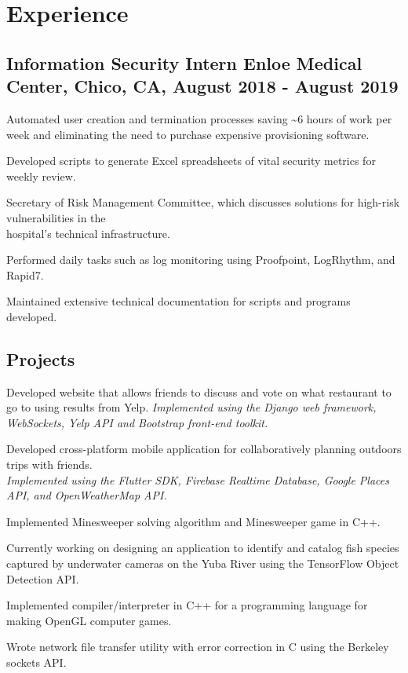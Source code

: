 \documentclass[letterpaper]{article}
\renewenvironment{itemize}{
  \begin{list}{}{
    \setlength{\leftmargin}{1.5em}
  }
}{
  \end{list}
}
\begin{document}
\section*{Experience}
\subsection*{Information Security Intern Enloe Medical Center, Chico, CA, August 2018 - August 2019
}
\begin{itemize}
    \item[$\bullet$] Automated user creation and termination processes saving \textasciitilde 6 hours of work per week and eliminating the need to purchase expensive provisioning software.
 \item[$\bullet$] Developed scripts to generate Excel spreadsheets of vital security metrics for weekly review.
 \item[$\bullet$] Secretary of Risk Management Committee, which discusses solutions for high-risk vulnerabilities in the\\hospital's technical infrastructure.
 \item[$\bullet$] Performed daily tasks such as log monitoring using Proofpoint, LogRhythm, and Rapid7.
 \item[$\bullet$] Maintained extensive technical documentation for scripts and programs developed.
\end{itemize}
\subsection*{Projects}
\begin{itemize}
    \item[$\bullet$] Developed website that allows friends to discuss and vote on what restaurant to go to using results from Yelp. \emph{Implemented using the Django web framework, WebSockets, Yelp API and Bootstrap front-end toolkit.}
    \item[$\bullet$] Developed cross-platform mobile application for collaboratively planning outdoors trips with friends.\\\emph{Implemented using the Flutter SDK, Firebase Realtime Database, Google Places API, and OpenWeatherMap API.}
    \item[$\bullet$] Implemented Minesweeper solving algorithm and Minesweeper game in C++.
    \item[$\bullet$] Currently working on designing an application to identify and catalog fish species captured by underwater cameras on the Yuba River using the TensorFlow Object Detection API.
    \item[$\bullet$] Implemented compiler/interpreter in C++ for a programming language for making OpenGL computer games.
    \item[$\bullet$] Wrote network file transfer utility with error correction in C using the Berkeley sockets API.
\end{itemize}
\end{document}
